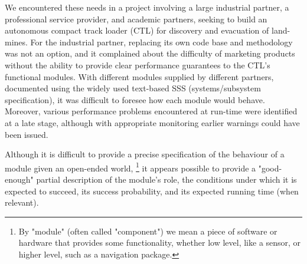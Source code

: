 \documentclass[ 5p, 12pt, times, twocolumn, sort&compress ]{elsarticle}
\begin{document}
We encountered these needs in a project involving a large industrial partner, a professional service provider, and academic partners, seeking to build an autonomous compact track loader (CTL) for discovery and evacuation of land-mines. 
%
For the industrial partner, replacing its own code base and methodology was not an option, and it complained about the difficulty of marketing products without the ability to  provide clear performance guarantees to the CTL's functional modules. With different modules supplied by different partners, documented using the widely used text-based SSS (systems/subsystem  specification), it was difficult to foresee how each module would behave.
Moreover, various performance problems encountered at run-time were identified at a late stage, although with appropriate monitoring earlier warnings could have been issued.









Although it is difficult to provide a precise specification of the behaviour of a module given an open-ended world,%
\footnote{By "module" (often called "component") we mean a piece of software or hardware that provides some
functionality, whether low level, like a sensor, or higher level, such as a navigation package.}
it appears possible to provide a "good-enough" partial description of the module's role, the conditions under which it is expected to succeed, its success probability, and its expected running time (when relevant).
\end{document}
